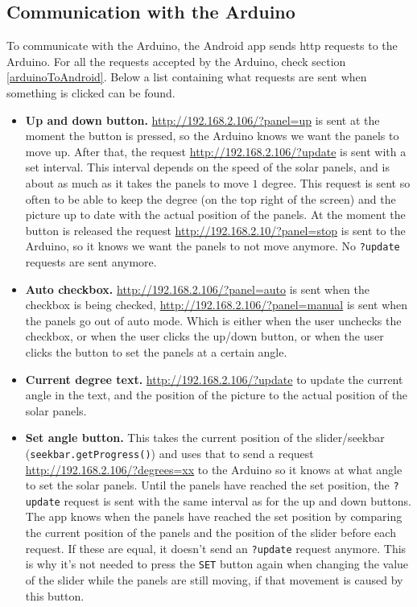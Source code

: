 \documentclass{article}
\begin{document}
		\subsection{Communication with the Arduino}
			To communicate with the Arduino, the Android app sends http requests to the Arduino. For all the requests accepted by the Arduino, check section \ref{arduinoToAndroid}. Below a list containing what requests are sent when something is clicked can be found.
			\begin{itemize}
				\item \textbf{Up and down button.} \url{http://192.168.2.106/?panel=up} is sent at the moment the button is pressed, so the Arduino knows we want the panels to move up. After that, the request \url{http://192.168.2.106/?update} is sent with a set interval. This interval depends on the speed of the solar panels, and is about as much as it takes the panels to move $1$ degree. This request is sent so often to be able to keep the degree (on the top right of the screen) and the picture up to date with the actual position of the panels. At the moment the button is released the request \url{http://192.168.2.10/?panel=stop} is sent to the Arduino, so it knows we want the panels to not move anymore. No \verb|?update| requests are sent anymore.
				
				\item \textbf{Auto checkbox.} \url{http://192.168.2.106/?panel=auto} is sent when the checkbox is being checked, \url{http://192.168.2.106/?panel=manual} is sent when the panels go out of auto mode. Which is either when the user unchecks the checkbox, or when the user clicks the up/down button, or when the user clicks the button to set the panels at a certain angle.
				
				\item \textbf{Current degree text.} \url{http://192.168.2.106/?update} to update the current angle in the text, and the position of the picture to the actual position of the solar panels.
				
				\item \textbf{Set angle button.} This takes the current position of the slider/seekbar (\verb|seekbar.getProgress()|) and uses that to send a request \url{http://192.168.2.106/?degrees=xx} to the Arduino so it knows at what angle to set the solar panels. Until the panels have reached the set position, the \verb|?update| request is sent with the same interval as for the up and down buttons. The app knows when the panels have reached the set position by comparing the current position of the panels and the position of the slider before each request. If these are equal, it doesn't send an \verb|?update| request anymore. This is why it's not needed to press the \verb|SET| button again when changing the value of the slider while the panels are still moving, if that movement is caused by this button.
			\end{itemize}
	
\end{document}
